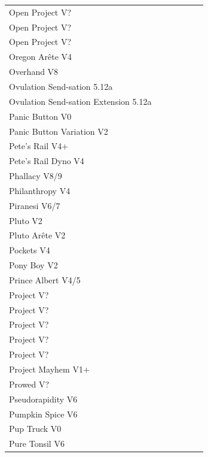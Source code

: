 \begin{flushleft}
\begin{center}
\begin{supertabular}{p{0.76\linewidth}p{0.08\linewidth}}
Open Project V? & \pageref{rt:cliffs_proj_3} \\
Open Project V? & \pageref{rt:cliffs_proj_4} \\
Open Project V? & \pageref{rt:cliffs_proj_5} \\
Oregon Arête V4 & \pageref{rt:Oregon Arête} \\
Overhand V8 & \pageref{rt:Overhand} \\
Ovulation Send-sation 5.12a & \pageref{rt:Ovulation Send-sation} \\
Ovulation Send-sation Extension 5.12a & \pageref{vr:Ovulation Send-sation Extension} \\
Panic Button V0 & \pageref{rt:Panic Button} \\
Panic Button Variation V2 & \pageref{vr:Panic Button Variation} \\
Pete's Rail V4+ & \pageref{vr:Pete's Rail} \\
Pete's Rail Dyno V4 & \pageref{vr:Pete's Rail Dyno} \\
Phallacy V8/9 & \pageref{rt:Phallacy} \\
Philanthropy V4 & \pageref{rt:Philanthropy} \\
Piranesi V6/7 & \pageref{rt:Piranesi} \\
Pluto V2 & \pageref{rt:Pluto} \\
Pluto Arête V2 & \pageref{rt:Pluto Arête} \\
Pockets V4 & \pageref{rt:Pockets} \\
Pony Boy V2 & \pageref{rt:Pony Boy} \\
Prince Albert V4/5 & \pageref{rt:Prince Albert} \\
Project V? & \pageref{rt:Big_1} \\
Project V? & \pageref{rt:Schrödinger Project} \\
Project V? & \pageref{vr:Project} \\
Project V? & \pageref{rt:PR_2} \\
Project V? & \pageref{rt:Machete 3} \\
Project Mayhem V1+ & \pageref{rt:Project Mayhem} \\
Prowed V? & \pageref{vr:Prowed} \\
Pseudorapidity V6 & \pageref{rt:Pseudorapidity} \\
Pumpkin Spice V6 & \pageref{rt:Pumpkin Spice} \\
Pup Truck V0 & \pageref{rt:Pup Truck} \\
Pure Tonsil V6 & \pageref{vr:Pure Tonsil} \\

\end{supertabular}
\end{center}
\end{flushleft}
